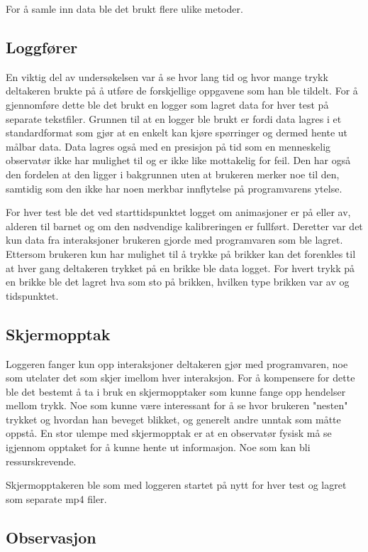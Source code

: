  
For å samle inn data ble det brukt flere ulike metoder.  
 
 
\subsection{Loggfører} 

En viktig del av undersøkelsen var å se hvor lang tid og hvor mange trykk deltakeren brukte på å utføre de forskjellige oppgavene som han ble tildelt. For å gjennomføre dette ble det brukt en logger som lagret data for hver test på separate tekstfiler. Grunnen til at en logger ble brukt er fordi data lagres i et standardformat som gjør at en enkelt kan kjøre spørringer og dermed hente ut målbar data. Data lagres også med en presisjon på tid som en menneskelig observatør ikke har mulighet til og er ikke like mottakelig for feil. Den har også den fordelen at den ligger i bakgrunnen uten at brukeren merker noe til den, samtidig som den ikke har noen merkbar innflytelse på programvarens ytelse. 
 
 
For hver test ble det ved starttidspunktet logget om animasjoner er på eller av, alderen til barnet og om den nødvendige kalibreringen er fullført. Deretter var det kun data fra interaksjoner brukeren gjorde med programvaren som ble lagret. Ettersom brukeren kun har mulighet til å trykke på brikker kan det forenkles til at hver gang deltakeren trykket på en brikke ble data logget. For hvert trykk på en brikke ble det lagret hva som sto på brikken, hvilken type brikken var av og tidspunktet. 
 
 
\subsection{Skjermopptak} 
 
Loggeren fanger kun opp interaksjoner deltakeren gjør med programvaren, noe som utelater det som skjer imellom hver interaksjon. For å kompensere for dette ble det bestemt å ta i bruk en skjermopptaker som kunne fange opp hendelser mellom trykk. Noe som kunne være interessant for å se hvor brukeren "nesten" trykket og hvordan han beveget blikket, og generelt andre unntak som måtte oppstå. En stor ulempe med skjermopptak er at en observatør fysisk må se igjennom opptaket for å kunne hente ut informasjon. Noe som kan bli ressurskrevende.
 
Skjermopptakeren ble som med loggeren startet på nytt for hver test og lagret som separate mp4 filer.  
 
 
\subsection{Observasjon} 
 
